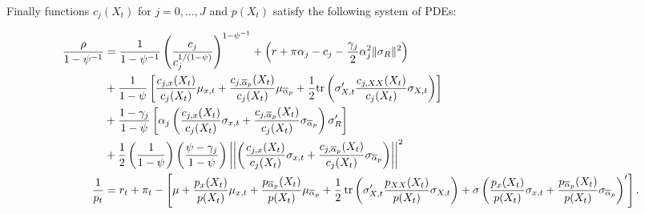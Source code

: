Finally functions $ c_j(X_t) $ for $ j=0,\ldots,J $ and $ p(X_t) $ satisfy the following system of PDEs:
\begin{footnotesize}
	\begin{align}\label{eq:PDEs}
		\frac{\rho}{1-\psi^{-1}}&=\frac{1}{1-\psi^{-1}}\left(\frac{c_j}{c_j^{1/(1-\psi)}}\right)^{1-\psi^{-1}}+
		\left(r+\pi\alpha_{j}-c_j-\frac{\gamma_j}{2}\alpha_j^2\|\sigma_{R}\|^2\right)\nonumber\\
		&+\frac{1}{1-\psi}\left[\frac{c_{j,x}(X_t)}{c_j(X_t)}\mu_{x,t}+\frac{c_{j,\overline{\alpha}_p}(X_t)}{c_j(X_t)}\mu_{\overline{\alpha}_p}+
		\frac{1}{2}\text{tr}\left(\sigma_{X,t}'\frac{c_{j,XX}(X_t)}{c_j(X_t)}\sigma_{X,t}\right)\right]\nonumber\\
		&+\frac{1-\gamma_j}{1-\psi}\left[\alpha_j\left(\frac{c_{j,x}(X_t)}{c_j(X_t)} \sigma_{x,t} + \frac{c_{j,{\overline{\alpha}_p}}(X_t)}{c_j(X_t)}\sigma_{\overline{\alpha}_p}\right)\sigma_R'\right]\nonumber\\
		&+\frac{1}{2}\left(\frac{1}{1-\psi}\right)\left(\frac{\psi-\gamma_j}{1-\psi}\right)\left|\left|\left(\frac{c_{j,x}(X_t)}{c_j(X_t)} \sigma_{x,t} + \frac{c_{j,{\overline{\alpha}_p}}(X_t)}{c_j(X_t)}\sigma_{\overline{\alpha}_p}\right)\right|\right|^2\\
		\frac{1}{p_t} &= r_t + \pi_t  -\left[\mu +\frac{p_x(X_t)}{p(X_t)}\mu_{x,t}+\frac{p_{\overline{\alpha}_p}(X_t)}{p(X_t)}\mu_{\overline{\alpha}_p}+\frac{1}{2}\operatorname{tr}\left(\sigma_{X,t}'\frac{p_{XX}(X_t)}{p(X_t)}\sigma_{X,t}\right) + \sigma \left(\frac{p_x(X_t)}{p(X_t)} \sigma_{x,t} + \frac{p_{\overline{\alpha}_p}(X_t)}{p(X_t)} \sigma_{\overline{\alpha}_p}\right)'\right].
	\end{align}
\end{footnotesize}





